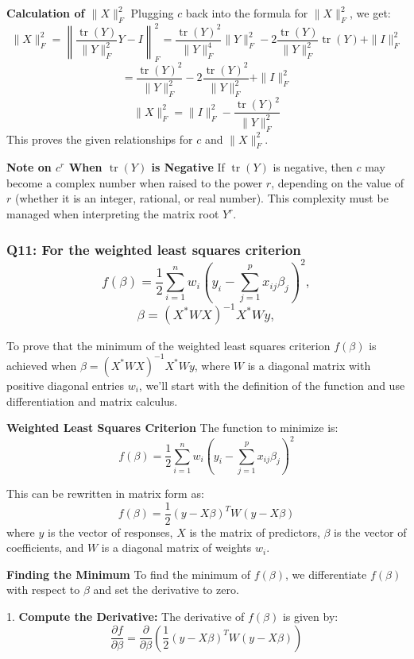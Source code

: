 \documentclass[8pt]{article}
\begin{document}
\textbf{Calculation of \(\|X\|_F^2\)}
Plugging \(c\) back into the formula for \(\|X\|_F^2\), we get:
\[
\|X\|_F^2 = \left\| \frac{\operatorname{tr}(Y)}{\|Y\|_F^2}Y - I \right\|_F^2 = \frac{\operatorname{tr}(Y)^2}{\|Y\|_F^4}\|Y\|_F^2 - 2 \frac{\operatorname{tr}(Y)}{\|Y\|_F^2} \operatorname{tr}(Y) + \|I\|_F^2
\]
\[
= \frac{\operatorname{tr}(Y)^2}{\|Y\|_F^2} - 2 \frac{\operatorname{tr}(Y)^2}{\|Y\|_F^2} + \|I\|_F^2
\]
\[
\|X\|_F^2 = \|I\|_F^2 - \frac{\operatorname{tr}(Y)^2}{\|Y\|_F^2}
\]
This proves the given relationships for \(c\) and \(\|X\|_F^2\).

\textbf{Note on \(c^r\) When \(\operatorname{tr}(Y)\) is Negative}
If \(\operatorname{tr}(Y)\) is negative, then \(c\) may become a complex number when raised to the power \(r\), depending on the value of \(r\) (whether it is an integer, rational, or real number). This complexity must be managed when interpreting the matrix root \(Y^r\).

\subsubsection*{Q11: For the weighted least squares criterion
\[ f(\beta) = \frac{1}{2} \sum_{i=1}^n w_i \left( y_i - \sum_{j=1}^p x_{ij} \beta_j \right)^2, \]
\[ \beta = (X^* W X)^{-1} X^* W y, \]
}

To prove that the minimum of the weighted least squares criterion \( f(\beta) \) is achieved when \( \beta = (X^* W X)^{-1} X^* W y \), where \( W \) is a diagonal matrix with positive diagonal entries \( w_i \), we'll start with the definition of the function and use differentiation and matrix calculus.

\textbf{Weighted Least Squares Criterion}
The function to minimize is:
\[
f(\beta) = \frac{1}{2} \sum_{i=1}^n w_i \left( y_i - \sum_{j=1}^p x_{ij} \beta_j \right)^2
\]

This can be rewritten in matrix form as:
\[
f(\beta) = \frac{1}{2} (y - X\beta)^T W (y - X\beta)
\]
where \( y \) is the vector of responses, \( X \) is the matrix of predictors, \( \beta \) is the vector of coefficients, and \( W \) is a diagonal matrix of weights \( w_i \).

\textbf{Finding the Minimum}
To find the minimum of \( f(\beta) \), we differentiate \( f(\beta) \) with respect to \( \beta \) and set the derivative to zero.

1. \textbf{Compute the Derivative:}
   The derivative of \( f(\beta) \) is given by:
   \[
   \frac{\partial f}{\partial \beta} = \frac{\partial}{\partial \beta} \left( \frac{1}{2} (y - X\beta)^T W (y - X\beta) \right)
   \]
\end{document}
